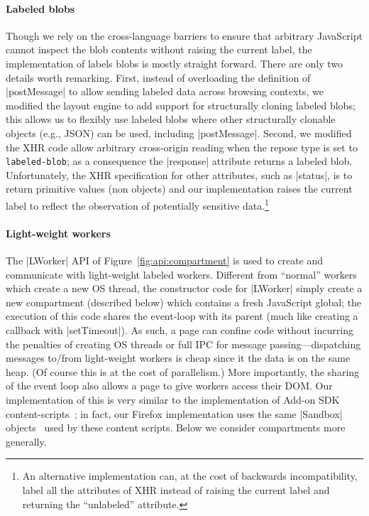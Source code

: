 \paragraph{Labeled blobs}
%
Though we rely on the cross-language barriers to ensure that arbitrary
JavaScript cannot inspect the blob contents without raising the
current label, the implementation of labels blobs is mostly straight
forward.
%
There are only two details worth remarking.
%
First, instead of overloading the definition of \js|postMessage| to
allow sending labeled data across browsing contexts, we modified the
layout engine to add support for structurally cloning labeled blobs;
this allows us to flexibly use labeled blobs where other structurally
clonable objects (e.g., JSON) can be used, including \js|postMessage|.
%
Second, we modified the XHR code allow arbitrary cross-origin reading
when the repose type is set to \verb|labeled-blob|;
%
as a consequence the \js|response| attribute returns a labeled blob.
%
Unfortunately, the XHR specification for other attributes, such as
\js|status|, is to return primitive values (non objects) and our
implementation raises the current label to reflect the observation of
potentially sensitive data.\footnote{
An alternative implementation can, at the cost of backwards
incompatibility, label all the attributes of XHR instead of raising
the current label and returning the ``unlabeled'' attribute.
}

\paragraph{Light-weight workers}
%
The \js|LWorker| API of Figure~\ref{fig:api:compartment} is used to
create and communicate with light-weight labeled workers.
%
Different from ``normal'' workers which create a new OS thread, the
constructor code for \js|LWorker| simply create a new compartment
(described below) which contains a fresh JavaScript global; the
execution of this code shares the event-loop with its parent (much
like creating a callback with \js|setTimeout|).
%
As such, a page can confine code without incurring the
penalties of creating OS threads or full IPC for message
passing---dispatching messages to/from light-weight workers is cheap
since it the data is on the same heap.
%
(Of course this is at the cost of parallelism.)
%
More importantly, the sharing of the event loop also allows a page to
give workers access their DOM.
%
Our implementation of this is very similar to the implementation of
Add-on SDK content-scripts~\cite{addon-sdk}; in fact, our Firefox
implementation uses the same \js|Sandbox| objects~\cite{mdn-sandbox}
used by these content scripts.
%
Below we consider compartments more generally.
 

